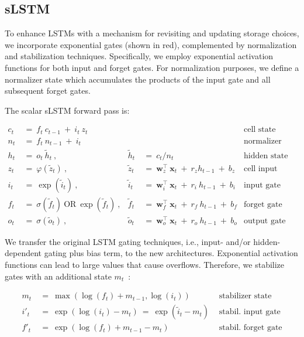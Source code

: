 \subsection{sLSTM}
\label{sec:sLSTM}

To enhance LSTMs with a mechanism for revisiting and updating storage choices, we incorporate exponential gates (shown in red), complemented by normalization and stabilization techniques. Specifically, we employ exponential activation functions for both input and forget gates. For normalization purposes, we define a normalizer state which accumulates the products of the input gate and all subsequent forget gates.

The scalar sLSTM forward pass is:

\begin{align}
\label{eq:slstmforward}
c_t \ &= \  f_t \ c_{t-1} \ + \ i_t \ z_t & & 
 &\text{cell state} \\
n_t \ &= \  f_t \ n_{t-1} \ + \ i_t  & & 
 &\text{normalizer state} \\
h_t \ &= \ o_t \ \tilde{h}_t \ ,
  &\tilde{h}_t \ &= \ c_t / n_t
&\text{hidden state} \\
z_t \ &= \ \varphi \left( \tilde{z}_t \right) \ , 
  &\tilde{z}_t \ &=  \ \mathbf{w}^\top_{z} \ \mathbf{x}_t \ + \
  r_{z}  h_{t-1} \ + \  b_{z}
  &\text{cell input} \\
i_t \ &= \ \!\exp \left( \tilde{i}_t  \right) \ , 
  &\tilde{i}_t \ &= \ \mathbf{w}^\top_{i} \ \mathbf{x}_t \ + \
  r_{i}  \ h_{t-1} \ + \  b_{i}
  &\text{input gate} \\
f_t \ &= \ \sigma \left(  \tilde{f}_t \right) \ \text{OR} \
\!\exp \left(  \tilde{f}_t \right) \ ,
  &\tilde{f}_t \ &= \ \mathbf{w}^\top_{f} \ \mathbf{x}_t  \ + \
  r_{f}  \ h_{t-1} \ + \  b_{f}
  &\text{forget gate} \\
o_t \ &= \ \sigma \left( \tilde{o}_t \right) \ , 
  &\tilde{o}_t  \ &= \ \mathbf{w}^\top_{o} \ \mathbf{x}_t \ + \
  r_{o}  \ h_{t-1} \ + \  b_{o}
  &\text{output gate} 
\end{align}

We transfer the original LSTM gating techniques, i.e., input- and/or hidden-dependent gating plus bias term, to the new architectures. Exponential activation functions can lead to large values that cause overflows. Therefore, we stabilize gates with an additional state \mbox{$m_t$~\citep{Milakov:18arxiv}}:

\begin{align}
\label{eq:slstmstabil}
m_t \ &= \ \max \left( \log ( f_t ) + m_{t-1} , \log ( i_t ) \right) &\text{stabilizer state} \\
i'_t \ &= \ \!\exp \left( \log \left ( i_t \right) - m_t \right) \ = \ \!\exp \left( \tilde{i}_t - m_t \right) \ \, 
  &\text{stabil. input gate} \\
f'_t \ &= \ \!\exp \left( \log \left( f_t \right) + m_{t-1} - m_t \right) \ \, 
  &\text{stabil. forget gate}
\end{align}

